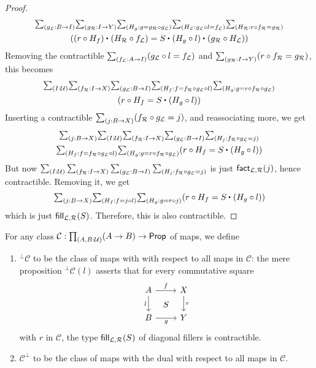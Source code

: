 \begin{proof}
\begin{multline*}
  \sm{g_\cL : B \to I}{g_\cR : I \to Y}{H_g : g = g_\cR \circ g_\cL}{H_\cL : g_\cL \circ l = f_\cL}{H_\cR : r\circ f_\cR = g_\cR}\\
(\ct{(r\circ H_f)}{(H_\cR \circ f_\cL)} = \ct S{\ct{(H_g \circ l)}{(g_\cR \circ H_\cL)}})
\end{multline*}
Removing the contractible $\sm{f_\cL : A \to I} (g_\cL \circ l = f_\cL)$ and $\sm{g_\cR : I \to Y} (r\circ f_\cR = g_\cR)$, this becomes
\begin{multline*}
  \sm{I:\UU}{f_\cR : I \to X}{g_\cL : B \to I}{H_f : f = f_\cR \circ g_\cL \circ l}{H_g : g = r\circ f_\cR \circ g_\cL}\\
(r\circ H_f = \ct S{(H_g \circ l)})
\end{multline*}
Inserting a contractible $\sm{j:B\to X} (f_\cR \circ g_\cL = j)$, and reassociating more, we get
\begin{multline*}
  \sm{j:B\to X}{I:\UU}{f_\cR : I \to X}{g_\cL : B \to I}{H_j:f_\cR \circ g_\cL = j}\\
  \sm{H_f : f = f_\cR \circ g_\cL \circ l}{H_g : g = r\circ f_\cR \circ g_\cL}
  (r\circ H_f = \ct S{(H_g \circ l)})
\end{multline*}
But now $\sm{I:\UU}{f_\cR : I \to X}{g_\cL : B \to I}{H_j:f_\cR \circ g_\cL = j}$ is just $\mathsf{fact}_{\mathcal{L},\mathcal{R}}(j)$, hence contractible.
Removing it, we get
\begin{equation*}
  \sm{j:B\to X}{H_f : f = j \circ l}{H_g : g = r\circ j}(r\circ H_f = \ct S{(H_g \circ l)})
\end{equation*}
which is just $\mathsf{fill}_{\mathcal{L},\mathcal{R}}(S)$.
Therefore, this is also contractible.
\end{proof}

\begin{defn}\label{defn:orthogonal}
For any class $\mathcal{C}:\prd*{A,B:\UU}(A\to B)\to\prop$ of maps, we define
\begin{enumerate}
\item $^{\bot}\mathcal{C}$ to be the class of maps with  with respect to all maps in $\mathcal{C}$: the mere proposition
$^\bot\mathcal{C}(l)$ asserts that for every commutative square
\begin{equation*}
\begin{tikzcd}
A \arrow[r,"f"] \arrow[d,swap,"l"] \ar[dr,phantom,"S"] & X \arrow[d,"r"] \\
B \arrow[r,swap,"g"] & Y
\end{tikzcd}
\end{equation*}
with $r$ in $\mathcal{C}$, the type $\mathsf{fill}_{\mathcal{L},\mathcal{R}}(S)$ of diagonal fillers is contractible.
\item $\mathcal{C}^\bot$ to be the class of maps with the dual  with respect to all maps in $\mathcal{C}$.
\end{enumerate}
\end{defn}

